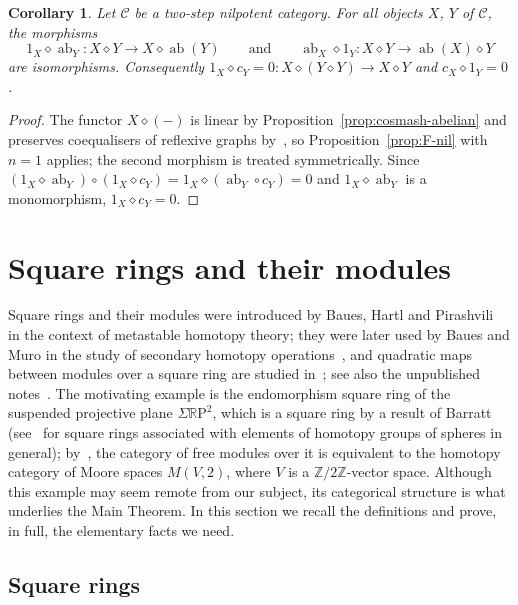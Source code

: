 \documentclass[reqno,a4paper]{amsart}
\theoremstyle{plain}
\newtheorem{corollary}[subsection]{Corollary}
\theoremstyle{definition}
\newcommand{\C}{\ensuremath{\mathcal{C}}}
\newcommand{\Z}{\ensuremath{\mathbb{Z}}}
\newcommand{\RP}{\ensuremath{\mathbb{R}\mathrm{P}}}
\DeclareMathOperator{\ab}{ab}
\newcommand{\cosmash}{\ensuremath{\diamond}}
\newcommand{\cc}[1]{\ensuremath{c_{#1}}}                    %
\begin{document}
\begin{corollary}\label{cor:cosmash-abelianisation}
  Let \(\C\) be a two-step nilpotent category. For all objects \(X\), \(Y\) of \(\C\), the morphisms
  \[
    1_{X}\cosmash\ab_{Y}\colon X\cosmash Y\to X\cosmash\ab(Y)\qquad\text{and}\qquad\ab_{X}\cosmash 1_{Y}\colon X\cosmash Y\to\ab(X)\cosmash Y
  \]
  are isomorphisms. Consequently \(1_{X}\cosmash\cc{Y}=0\colon X\cosmash(Y\cosmash Y)\to X\cosmash Y\) and \(\cc{X}\cosmash 1_{Y}=0\).
\end{corollary}

\begin{proof}
  The functor \(X\cosmash(-)\) is linear by Proposition~\ref{prop:cosmash-abelian} and preserves coequalisers of reflexive graphs by~\cite[Corollary~9.6]{DHVdL}, so Proposition~\ref{prop:F-nil} with \(n=1\) applies; the second morphism is treated symmetrically. Since \((1_{X}\cosmash\ab_{Y})\circ(1_{X}\cosmash\cc{Y})=1_{X}\cosmash(\ab_{Y}\circ\cc{Y})=0\) and \(1_{X}\cosmash\ab_{Y}\) is a monomorphism, \(1_{X}\cosmash\cc{Y}=0\).
\end{proof}

\section{Square rings and their modules}\label{sec:square-rings}

Square rings and their modules were introduced by Baues, Hartl and Pirashvili~\cite{BHP} in the context of metastable homotopy theory; they were later used by Baues and Muro in the study of secondary homotopy operations~\cite{Baues-Muro}, and quadratic maps between modules over a square ring are studied in~\cite{Gaudier-Hartl:Morphismes}; see also the unpublished notes~\cite{Pirashvili-Square-Rings, Hartl-WIP}. The motivating example is the endomorphism square ring of the suspended projective plane \(\Sigma\RP^{2}\), which is a square ring by a result of Barratt~\cite{Barratt-TrackGroups} (see~\cite{Baues-Iwase} for square rings associated with elements of homotopy groups of spheres in general); by~\cite[Theorem~8.1]{BHP}, the category of free modules over it is equivalent to the homotopy category of Moore spaces \(M(V,2)\), where \(V\) is a \(\Z/2\Z\)-vector space. Although this example may seem remote from our subject, its categorical structure is what underlies the Main Theorem. In this section we recall the definitions and prove, in full, the elementary facts we need.

\subsection{Square rings}\label{sec:square-rings-def}
\end{document}
